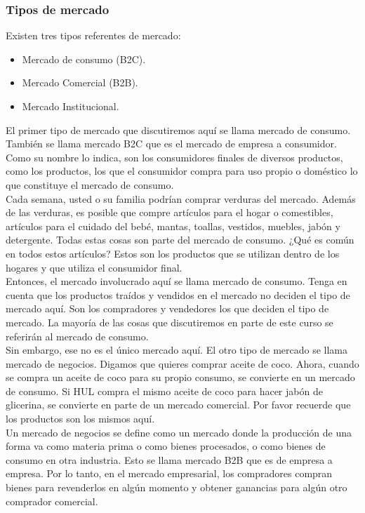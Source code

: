 \documentclass[10pt]{book}
\begin{document}
\subsubsection{Tipos de mercado}
Existen tres tipos referentes de mercado:
\begin{itemize}
\item Mercado de consumo (B2C).
\item Mercado Comercial (B2B).
\item Mercado Institucional.
\end{itemize}
El primer tipo de mercado que discutiremos aquí se llama mercado de consumo. También se llama mercado B2C que es el mercado de empresa a consumidor. Como su nombre lo indica, son los consumidores finales de diversos productos, como los productos, los que el consumidor compra para uso propio o doméstico lo que constituye el mercado de consumo.\\
Cada semana, usted o su familia podrían comprar verduras del mercado. Además de las verduras, es posible que compre artículos para el hogar o comestibles, artículos para el cuidado del bebé, mantas, toallas, vestidos, muebles, jabón y detergente. Todas estas cosas son parte del mercado de consumo. ¿Qué es común en todos estos artículos? Estos son los productos que se utilizan dentro de los hogares y que utiliza el consumidor final.\\
Entonces, el mercado involucrado aquí se llama mercado de consumo. Tenga en cuenta que los productos traídos y vendidos en el mercado no deciden el tipo de mercado aquí. Son los compradores y vendedores los que deciden el tipo de mercado. La mayoría de las cosas que discutiremos en parte de este curso se referirán al mercado de consumo.\\
Sin embargo, ese no es el único mercado aquí. El otro tipo de mercado se llama mercado de negocios. Digamos que quieres comprar aceite de coco. Ahora, cuando se compra un aceite de coco para su propio consumo, se convierte en un mercado de consumo. Si HUL compra el mismo aceite de coco para hacer jabón de glicerina, se convierte en parte de un mercado comercial. Por favor recuerde que los productos son los mismos aquí.\\
Un mercado de negocios se define como un mercado donde la producción de una forma va como materia prima o como bienes procesados, o como bienes de consumo en otra industria. Esto se llama mercado B2B que es de empresa a empresa. Por lo tanto, en el mercado empresarial, los compradores compran bienes para revenderlos en algún momento y obtener ganancias para algún otro comprador comercial.\\
\end{document}
